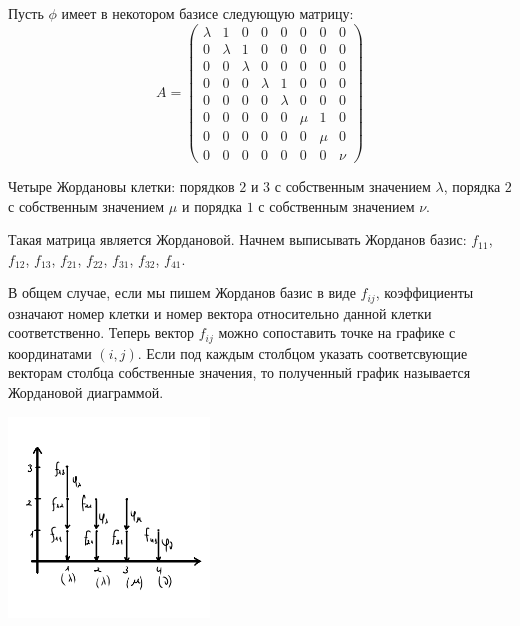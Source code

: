 \begin{example}
    Пусть $\phi$ имеет в некотором базисе следующую матрицу:
        \[A = \begin{pmatrix}
        \lambda & 1        & 0       & 0       & 0        & 0    &0    & 0\\
        0       & \lambda  & 1       & 0       & 0        & 0    &0    & 0\\
        0       & 0        & \lambda & 0       & 0        & 0    &0    & 0\\
        0       & 0        & 0       & \lambda & 1        & 0    &0    & 0\\
        0       & 0        & 0       & 0       & \lambda  & 0    &0    & 0\\
        0       & 0        & 0       & 0       & 0        & \mu  &1    & 0\\
        0       & 0        & 0       & 0       & 0        & 0    &\mu  & 0\\
        0       & 0        & 0       & 0       & 0        & 0    &0    & \nu
        \end{pmatrix}\]
        
    Четыре Жордановы клетки: порядков $2$ и $3$ с собственным значением $\lambda$, порядка $2$ с собственным значением $\mu$ и порядка $1$ с собственным значением $\nu$. 
    
    Такая матрица является Жордановой. Начнем выписывать Жорданов базис: $f_{11}$, $f_{12}$, $f_{13}$, $f_{21}$, $f_{22}$, $f_{31}$, $f_{32}$, $f_{41}$.
    
    В общем случае, если мы пишем Жорданов базис в виде $f_{ij}$, коэффициенты означают номер клетки и 
    номер вектора относительно данной клетки соответственно. Теперь вектор $f_{ij}$ можно сопоставить 
    точке на графике с координатами $(i, j)$. Если под каждым столбцом указать соответсвующие векторам столбца собственные значения, то полученный график называется Жордановой диаграммой.
    \begin{center}
        \includegraphics[width = 0.4\textwidth]{images/lec6_1.PNG}
    \end{center}
\end{example}


